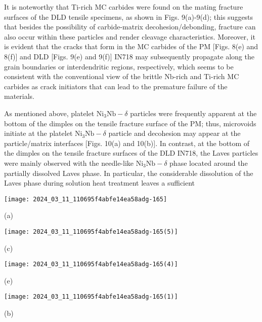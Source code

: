 \documentclass[10pt]{article}
\begin{document}
It is noteworthy that Ti-rich MC carbides were found on the mating fracture surfaces of the DLD tensile specimens, as shown in Figs. 9(a)-9(d); this suggests that besides the possibility of carbide-matrix decohesion/debonding, fracture can also occur within these particles and render cleavage characteristics. Moreover, it is evident that the cracks that form in the MC carbides of the PM [Figs. 8(e) and 8(f)] and DLD [Figs. 9(e) and 9(f)] IN718 may subsequently propagate along the grain boundaries or interdendritic regions, respectively, which seems to be consistent with the conventional view of the brittle $\mathrm{Nb}$-rich and Ti-rich MC carbides as crack initiators that can lead to the premature failure of the materials.

As mentioned above, platelet $\mathrm{Ni}_{3} \mathrm{Nb}-\delta$ particles were frequently apparent at the bottom of the dimples on the tensile fracture surface of the PM; thus, microvoids initiate at the platelet $\mathrm{Ni}_{3} \mathrm{Nb}-\delta$ particle and decohesion may appear at the particle/matrix interfaces [Figs. 10(a) and 10(b)]. In contrast, at the bottom of the dimples on the tensile fracture surfaces of the DLD IN718, the Laves particles were mainly observed with the needle-like $\mathrm{Ni}_{3} \mathrm{Nb}-\delta$ phase located around the partially dissolved Laves phase. In particular, the considerable dissolution of the Laves phase during solution heat treatment leaves a sufficient

\begin{center}
\texttt{[image: 2024\_03\_11\_110695f4abfe14ea58adg-165]}
\end{center}

(a)

\begin{center}
\texttt{[image: 2024\_03\_11\_110695f4abfe14ea58adg-165(5)]}
\end{center}

(c)

\begin{center}
\texttt{[image: 2024\_03\_11\_110695f4abfe14ea58adg-165(4)]}
\end{center}

(e)

\begin{center}
\texttt{[image: 2024\_03\_11\_110695f4abfe14ea58adg-165(1)]}
\end{center}

(b)
\end{document}
